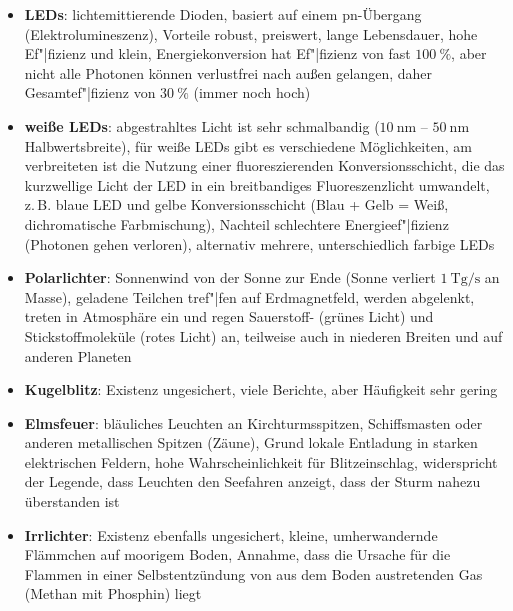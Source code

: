 \begin{itemize}
    \item
    \textbf{LEDs}:
    lichtemittierende Dioden,
    basiert auf einem pn-Übergang (Elektrolumineszenz),
    Vorteile robust, preiswert, lange Lebensdauer, hohe Ef"|fizienz und klein,
    Energiekonversion hat Ef"|fizienz von fast $\SI{100}{\percent}$, aber
    nicht alle Photonen können verlustfrei nach außen gelangen, daher
    Gesamtef"|fizienz von $\SI{30}{\percent}$ (immer noch hoch)
    
    \item
    \textbf{weiße LEDs}:
    abgestrahltes Licht ist sehr schmalbandig
    ($\SI{10}{\nano\meter}$ -- $\SI{50}{\nano\meter}$ Halbwertsbreite),
    für weiße LEDs gibt es verschiedene Möglichkeiten,
    am verbreiteten ist die Nutzung einer fluoreszierenden Konversionsschicht,
    die das kurzwellige Licht der LED in ein breitbandiges Fluoreszenzlicht
    umwandelt, z.\,B. blaue LED und gelbe Konversionsschicht
    (Blau + Gelb = Weiß, dichromatische Farbmischung),
    Nachteil schlechtere Energieef"|fizienz (Photonen gehen verloren),
    alternativ mehrere, unterschiedlich farbige LEDs
\end{itemize}
\linie
\begin{itemize}
    \item
    \textbf{Polarlichter}:
    Sonnenwind von der Sonne zur Ende
    (Sonne verliert $\SI{1}{\tera\gram\per\second}$ an Masse),
    geladene Teilchen tref"|fen auf Erdmagnetfeld, werden abgelenkt,
    treten in Atmosphäre ein und regen Sauerstoff- (grünes Licht) und
    Stickstoffmoleküle (rotes Licht) an,
    teilweise auch in niederen Breiten und auf anderen Planeten
\end{itemize}
\linie
\begin{itemize}
    \item
    \textbf{Kugelblitz}:
    Existenz ungesichert,
    viele Berichte, aber Häufigkeit sehr gering
    
    \item
    \textbf{Elmsfeuer}:
    bläuliches Leuchten an Kirchturmsspitzen, Schiffsmasten oder anderen
    metallischen Spitzen (Zäune),
    Grund lokale Entladung in starken elektrischen Feldern,
    hohe Wahrscheinlichkeit für Blitzeinschlag,
    widerspricht der Legende, dass Leuchten den Seefahren anzeigt, dass der
    Sturm nahezu überstanden ist
    
    \item
    \textbf{Irrlichter}:
    Existenz ebenfalls ungesichert,
    kleine, umherwandernde Flämmchen auf moorigem Boden,
    Annahme, dass die Ursache für die Flammen in einer Selbstentzündung von
    aus dem Boden austretenden Gas (Methan mit Phosphin) liegt
\end{itemize}

\pagebreak
